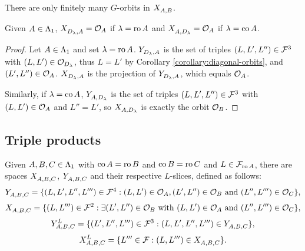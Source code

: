 \documentclass[a4paper, 11pt]{report}
\begin{document}
\begin{observation}
There are only finitely many $G$-orbits in $\xprod{A,B}$.
\end{observation}

\begin{lemma}\label{lemma:product-with-diagonal-orbits}
Given $A\in\matrices$, $\xprod{D_\lambda,A}=\orbit{A}$ if $\lambda=\ro{A}$ and $\xprod{A,D_\lambda}=\orbit{A}$ if $\lambda=\co{A}$.
\end{lemma}

\begin{proof}
Let $A\in\matrices$ and set $\lambda=\ro{A}$. $\yprod{D_\lambda,A}$ is the set of triples $(L,L',L'')\in\flags^3$ with $(L,L')\in\orbit{D_\lambda}$, thus $L=L'$ by Corollary \ref{corollary:diagonal-orbits}, and $(L',L'')\in\orbit{A}$. $\xprod{D_\lambda,A}$ is the projection of $\yprod{D_\lambda,A}$, which equals $\orbit{A}$.

Similarly, if $\lambda=\co{A}$, $\yprod{A,D_\lambda}$ is the set of triples $(L,L',L'')\in\flags^3$ with $(L,L')\in\orbit{A}$ and $L''=L'$, so $\xprod{A,D_\lambda}$ is exactly the orbit $\orbit{B}$.
\end{proof}

\subsection{Triple products}\label{sec:triple-product}

Given $A,B,C\in\matrices$ with $\co{A}=\ro{B}$ and $\co{B}=\ro{C}$ and $L\in\flags_{\ro{A}}$, there are spaces $\xprod{A,B,C}$, $\yprod{A,B,C}$ and their respective $L$-slices, defined as follows:
\begin{equation*}
\yprod{A,B,C} = \{(L,L',L'',L''')\in\flags^4: (L,L')\in\orbit{A}, (L',L'')\in\orbit{B} \text{ and } (L'',L''')\in\orbit{C}\},
\end{equation*}
\begin{equation*}
\xprod{A,B,C} = \{(L,L''')\in\flags^2: \exists (L',L'')\in\orbit{B} \text{ with } (L,L')\in\orbit{A} \text{ and } (L'',L''')\in\orbit{C}\},
\end{equation*}
\begin{equation*}
\yprod[L]{A,B,C} = \{ (L',L'',L''')\in\flags^3: (L,L',L'',L''')\in\yprod{A,B,C}\},
\end{equation*}
\begin{equation*}
\xprod[L]{A,B,C} = \{ L'''\in\flags: (L,L''')\in\xprod{A,B,C}\}.
\end{equation*}
\end{document}
